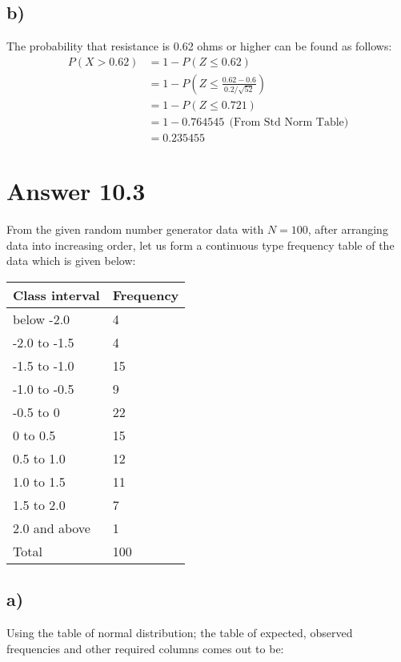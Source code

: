 \documentclass[12pt]{article}
\begin{document}
\subsection*{b)}
The probability that resistance is 0.62 ohms or higher can be found as follows:
\begin{align*}
P(X > 0.62) &= 1-P(Z \leq 0.62) \\
			&= 1-P(Z \leq \frac{0.62-0.6}{0.2 / \sqrt{52}}) \\
			&= 1-P(Z \leq 0.721) \\
			&= 1-0.764545 \ \ \text{(From Std Norm Table)} \\
			&= 0.235455
\end{align*}

\newpage
\section*{Answer 10.3}
From the given random number generator data with $N=100$, after arranging data into increasing order, let us form a continuous type frequency table of the data which is given below:

\begin{table}[h]
\begin{tabular}{|l|l|}
\hline
Class interval & Frequency \\ \hline
below -2.0     & 4         \\ \hline
-2.0 to -1.5   & 4         \\ \hline
-1.5 to -1.0   & 15        \\ \hline
-1.0 to -0.5   & 9         \\ \hline
-0.5 to 0      & 22        \\ \hline
0 to 0.5       & 15        \\ \hline
0.5 to 1.0     & 12        \\ \hline
1.0 to 1.5     & 11        \\ \hline
1.5 to 2.0     & 7         \\ \hline
2.0 and above  & 1         \\ \hline
Total          & 100       \\ \hline
\end{tabular}
\end{table}
\subsection*{a)}
Using the table of normal distribution; the table of expected, observed frequencies and other required columns comes out to be:
\end{document}
